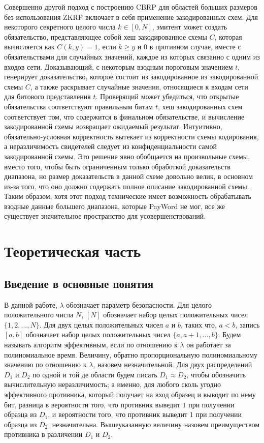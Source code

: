 \documentclass[a4paper]{report}
\begin{document}
	Совершенно другой подход с построению CBRP для областей больших размеров без использования ZKRP включает в себя применение закодированных схем.
	Для некоторого секретного целого числа $k \in [0, N]$, эмитент может создать обязательство, представляющее собой хеш закодированное схемы $C$, которая вычисляется как $C(k, y) = 1$, если $k \geq y$ и $0$ в противном случае, вместе с обязательствами для случайных значений, каждое из которых связанно с одним из входов сети.
	Доказывающий, с некоторым взодным пороговым значением $t$, генерирует доказательство, которое состоит из закодированное из закодированной схемы $C$, а также раскрывает случайные значения, относящиеся к входам сети для битового представления $t$.
	Проверящий может убедиться, что открытые обязательства соответствуют правильным битам $t$, хеш закодированных схем соответствует том, что содержится в финальном обязательстве, и вычисление закодированной схемы возвращает ожидаемый результат.
	Интуитивно, обязательно-условная корректность вытекает из корректности схемы кодирования, а неразличимость свидетелей следует из конфиденциальности самой закодированной схемы.
	Это решение явно обобщается на произвольные схемы, вместо того, чтобы быть ограниченным только обработкой доказательств диапазона, но размер доказательств в данной схеме довольно велик, в основном из-за того, что оно должно содержать полное описание закодированной схемы.
	Таким образом, хотя этот подход технические имеет возможность обрабатывать взодные данные большего диапазона, которые PayWord не мог, все же существует значительное пространство для усовершенствований.


	\chapter{Теоретическая часть}
	\section{Введение в основные понятия} %
	В данной работе, $\lambda$ обозначает параметр безопасности.
	Для целого положительного числа $N$, $[N]$ обозначает набор целых положительных чисел $\{1, 2, \dots, N\}$.
	Для двух целых положительных чисел $a$ и $b$, таких что, $a < b$, запись $[a, b]$ обозначает набор целых положительных чисел $\{a, a + 1, \dots, b\}$.
	Будем называть алгоритм эффективным, если по отношению к $\lambda$ он работает за полиномиальное время.
	Величину, обратно пропорциональную полиномиальному значению по отношению к $\lambda$, назовем незначительной.
	Для двух распределений $D_1$ и $D_2$ по одной и той де области будем писать $D_1 \approx D_2$, чтобы обозначить вычислительную неразличимость; а именно, для любого сколь угодно эффективного противника, который получает на вход образец и выводит по нему бит, разница в вероятности того, что противник выведит $1$ при получении образца из $D_1$, и вероятности того, что противник выведит $1$ при получении образца из $D_2$, незначительна.
	Вышеуказанную величину назовем преимуществом противника в различении $D_1$ и $D_2$.
\end{document}
